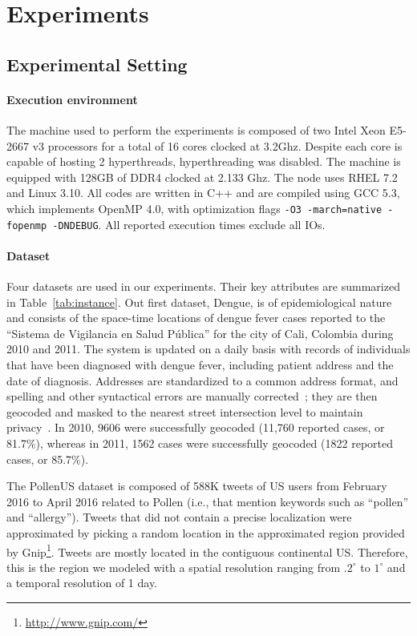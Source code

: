 \documentclass{article}
\begin{document}
\section{Experiments}

\label{sec:experiments}

\subsection{Experimental Setting}

\paragraph{Execution environment} The machine used to perform the experiments is
composed of two Intel Xeon E5-2667 v3 processors for a total of
16 cores clocked at 3.2Ghz. Despite each core is capable of hosting 2
hyperthreads, hyperthreading was disabled. The machine is equipped with
128GB of DDR4 clocked at 2.133 Ghz. The node uses RHEL 7.2
and Linux 3.10. All codes are written in C++ and are compiled using GCC 5.3, which implements
OpenMP 4.0, with optimization flags \texttt{-O3 -march=native -fopenmp
  -DNDEBUG}. All reported execution times exclude all IOs.

\paragraph{Dataset} Four datasets are used in our experiments. Their
key attributes are summarized in Table~\ref{tab:instance}. 
Out first dataset, Dengue, is of epidemiological nature and consists of the space-time
locations of dengue fever cases reported to the “Sistema de Vigilancia
en Salud P\'{u}blica” for the city of Cali, Colombia during 2010 and 2011. The
system is updated on a daily basis with records of individuals that
have been diagnosed with dengue fever, including patient address and
the date of diagnosis. Addresses are standardized to a common address
format, and spelling and other syntactical errors are manually
corrected~\cite{delmelle2013spatio}; they are then geocoded and masked
to the nearest street intersection level to maintain
privacy~\cite{Kwan04}. In 2010, 9606 were successfully geocoded
(11,760 reported cases, or 81.7\%), whereas in 2011, 1562 cases were
successfully geocoded (1822 reported cases, or 85.7\%).

The PollenUS dataset is composed of 588K tweets of US users from
February 2016 to April 2016 related to Pollen (i.e., that mention
keywords such as ``pollen'' and ``allergy''). Tweets that did not
contain a precise localization were approximated by picking a random
location in the approximated region provided by
Gnip\footnote{\url{http://www.gnip.com/}}. Tweets are mostly located
in the contiguous continental US. Therefore, this is the region we
modeled with a spatial resolution ranging from $.2^\circ$ to $1^\circ$
and a temporal resolution of 1 day.
\end{document}
